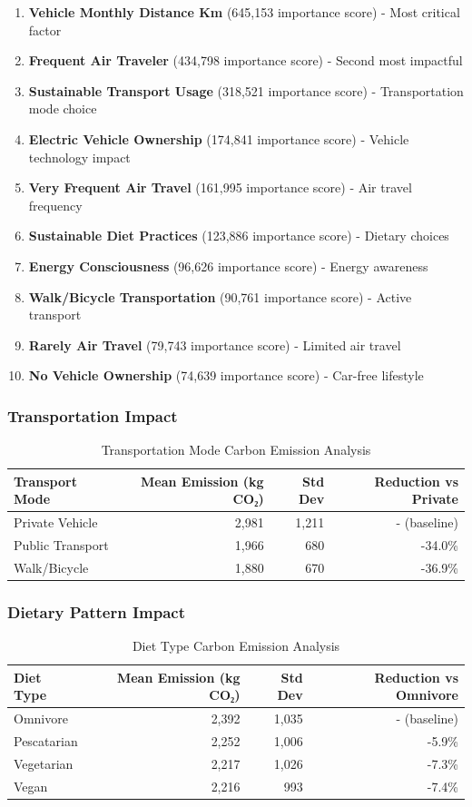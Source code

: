 \documentclass[12pt,a4paper]{article}
\begin{document}
\begin{enumerate}
    \item \textbf{Vehicle Monthly Distance Km} (645,153 importance score) - Most critical factor
    \item \textbf{Frequent Air Traveler} (434,798 importance score) - Second most impactful
    \item \textbf{Sustainable Transport Usage} (318,521 importance score) - Transportation mode choice
    \item \textbf{Electric Vehicle Ownership} (174,841 importance score) - Vehicle technology impact
    \item \textbf{Very Frequent Air Travel} (161,995 importance score) - Air travel frequency
    \item \textbf{Sustainable Diet Practices} (123,886 importance score) - Dietary choices
    \item \textbf{Energy Consciousness} (96,626 importance score) - Energy awareness
    \item \textbf{Walk/Bicycle Transportation} (90,761 importance score) - Active transport
    \item \textbf{Rarely Air Travel} (79,743 importance score) - Limited air travel
    \item \textbf{No Vehicle Ownership} (74,639 importance score) - Car-free lifestyle
\end{enumerate}

\subsubsection{Transportation Impact}
\begin{table}[H]
\centering
\caption{Transportation Mode Carbon Emission Analysis}
\begin{tabular}{@{}lrrr@{}}
\toprule
Transport Mode & Mean Emission (kg CO₂) & Std Dev & Reduction vs Private \\
\midrule
Private Vehicle & 2,981 & 1,211 & - (baseline) \\
Public Transport & 1,966 & 680 & -34.0\% \\
Walk/Bicycle & 1,880 & 670 & -36.9\% \\
\bottomrule
\end{tabular}
\end{table}

\subsubsection{Dietary Pattern Impact}
\begin{table}[H]
\centering
\caption{Diet Type Carbon Emission Analysis}
\begin{tabular}{@{}lrrr@{}}
\toprule
Diet Type & Mean Emission (kg CO₂) & Std Dev & Reduction vs Omnivore \\
\midrule
Omnivore & 2,392 & 1,035 & - (baseline) \\
Pescatarian & 2,252 & 1,006 & -5.9\% \\
Vegetarian & 2,217 & 1,026 & -7.3\% \\
Vegan & 2,216 & 993 & -7.4\% \\
\bottomrule
\end{tabular}
\end{table}
\end{document}
